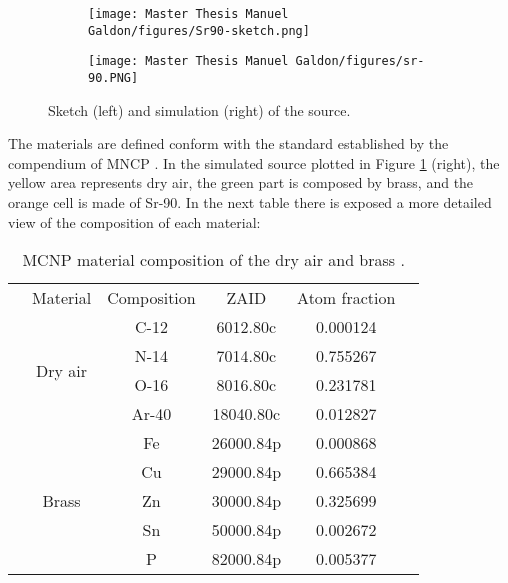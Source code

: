 \begin{figure}[!h]
\centering
\begin{subfigure}{0.4\textwidth}
    \texttt{[image: Master Thesis Manuel Galdon/figures/Sr90-sketch.png]} 
\end{subfigure}
\hfill
\begin{subfigure}{0.4\textwidth}
    \texttt{[image: Master Thesis Manuel Galdon/figures/sr-90.PNG]}
\end{subfigure}
        
    \caption{Sketch (left) and simulation (right) of the  source.}
\label{fig:PTW sketch and simulation}
\end{figure}

The materials are defined conform with the standard established by the compendium of MNCP \cite{matcomposition}. In the simulated source plotted in Figure \ref{fig:PTW sketch and simulation} (right), the yellow area represents dry air, the green part is composed by brass, and the orange cell is made of Sr-90. In the next table there is exposed a more detailed view of the composition of each material: 

\begin{table}[!h]
\centering

\begin{tabular}{l|c|c|c|c|l}
\cline{2-5}
 & Material                 & Composition & ZAID      & Atom fraction &  \\ \cline{2-5}
 & \multirow{4}{*}{Dry air} & C-12         & 6012.80c  & 0.000124      &  \\ \cline{3-5}
 &                          & N-14         & 7014.80c  & 0.755267      &  \\ \cline{3-5}
 &                          & O-16         & 8016.80c  & 0.231781      &  \\ \cline{3-5}
 &                          & Ar-40        & 18040.80c & 0.012827      &  \\ \cline{2-5}
 & \multirow{5}{*}{Brass}   & Fe           & 26000.84p & 0.000868      &  \\ \cline{3-5}
 &                          & Cu           & 29000.84p & 0.665384      &  \\ \cline{3-5}
 &                          & Zn           & 30000.84p & 0.325699      &  \\ \cline{3-5}
 &                          & Sn           & 50000.84p & 0.002672      &  \\ \cline{3-5}
 &                          & P            & 82000.84p & 0.005377      &  \\ \cline{2-5}
\end{tabular}
\caption{MCNP material composition of the dry air and brass \cite{matcomposition}.}
\label{table:composition of Sr-90 source materals}
\end{table}

